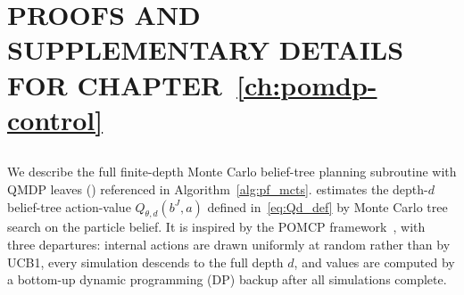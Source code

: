 \chapter{PROOFS AND SUPPLEMENTARY DETAILS FOR CHAPTER~\ref{ch:pomdp-control}}
\label{app:pomdp-control}



\section[Finite-Depth Belief-Tree Planning Subroutine]{}
\label{app:mctq}

We describe the full finite-depth Monte Carlo belief-tree planning subroutine with QMDP leaves () referenced in Algorithm~\ref{alg:pf_mcts}.
 estimates the depth-$d$ belief-tree action-value $Q_{\theta,d}(b^J,a)$ defined in~\eqref{eq:Qd_def} by Monte Carlo tree search on the particle belief.
It is inspired by the POMCP framework~\citep{silver2010monte}, with three departures: internal actions are drawn uniformly at random rather than by UCB1, every simulation descends to the full depth $d$, and values are computed by a bottom-up dynamic programming (DP) backup after all simulations complete.

